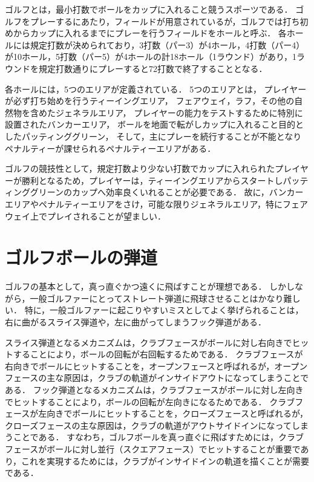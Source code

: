 ゴルフとは，最小打数でボールをカップに入れること競うスポーツである．
ゴルフをプレーするにあたり，フィールドが用意されているが，ゴルフでは打ち初めからカップに入れるまでにプレーを行うフィールドをホールと呼ぶ．
各ホールには規定打数が決められており，3打数（パー3）が4ホール，4打数（パー4）が10ホール，5打数（パー5）が4ホールの計18ホール（1ラウンド）があり，1ラウンドを規定打数通りにプレーすると72打数で終了することとなる．

各ホールには，5つのエリアが定義されている．
5つのエリアとは，
プレイヤーが必ず打ち始めを行うティーイングエリア，
フェアウェイ，ラフ，その他の自然物を含めたジェネラルエリア，
プレイヤーの能力をテストするために特別に設置されたバンカーエリア，
ボールを地面で転がしカップに入れること目的としたパッティンググリーン，
そして，主にプレーを続行することが不能となりペナルティーが課せられるペナルティーエリアがある．

ゴルフの競技性として，規定打数より少ない打数でカップに入れられたプレイヤーが勝利となるため，プレイヤーは，ティーイングエリアからスタートしパッティンググリーンのカップへ効率良くいれることが必要である．
故に，バンカーエリアやペナルティーエリアをさけ，可能な限りジェネラルエリア，特にフェアウェイ上でプレイされることが望ましい．

\section{ゴルフボールの弾道}
ゴルフの基本として，真っ直ぐかつ遠くに飛ばすことが理想である．
しかしながら，一般ゴルファーにとってストレート弾道に飛球させることはかなり難しい．
特に，一般ゴルファーに起こりやすいミスとしてよく挙げられることは，右に曲がるスライス弾道や，左に曲がってしまうフック弾道がある．

スライス弾道となるメカニズムは，クラブフェースがボールに対し右向きでヒットすることにより，ボールの回転が右回転するためである．
クラブフェースが右向きでボールにヒットすることを，オープンフェースと呼ばれるが，オープンフェースの主な原因は，クラブの軌道がインサイドアウトになってしまうことである．
フック弾道となるメカニズムは，クラブフェースがボールに対し左向きでヒットすることにより，ボールの回転が左向きになるためである．
クラブフェースが左向きでボールにヒットすることを，クローズフェースと呼ばれるが，クローズフェースの主な原因は，クラブの軌道がアウトサイドインになってしまうことである．
すなわち，ゴルフボールを真っ直ぐに飛ばすためには，クラブフェースがボールに対し並行（スクエアフェース）でヒットすることが重要であり，これを実現するためには，クラブがインサイドインの軌道を描くことが需要である．


